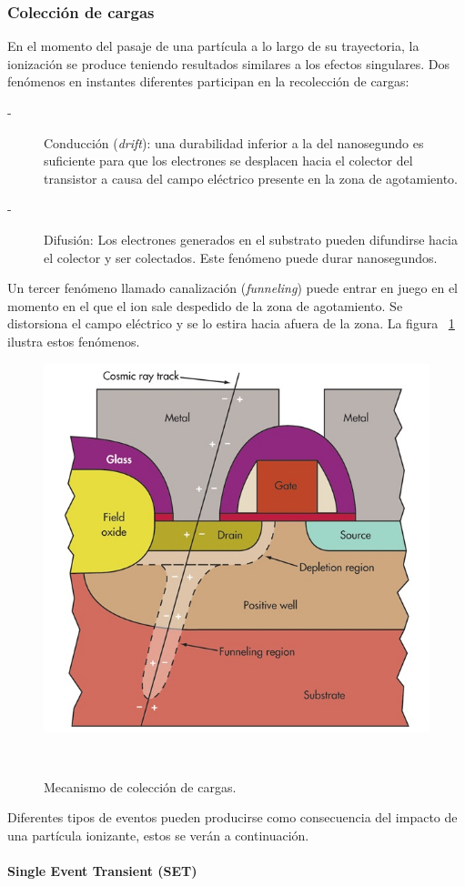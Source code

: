 \documentclass[a4paper,openright,12pt]{report}
\begin{document}
\subsubsection{Colección de cargas}

En el momento del pasaje de una partícula a lo largo de su trayectoria, la ionización se produce teniendo resultados similares a los efectos singulares. Dos fenómenos en instantes diferentes participan en la recolección de cargas:
\begin{description}
\item[-] Conducción (\textit{drift}): una durabilidad inferior a la del nanosegundo es suficiente para que los electrones se desplacen hacia el colector del transistor a causa del campo eléctrico presente en la zona de agotamiento. 
\item[-] Difusión: Los electrones generados en el substrato pueden difundirse hacia el colector y ser colectados. Este fenómeno puede durar nanosegundos.
\end{description}
Un tercer fenómeno llamado canalización (\textit{funneling}) puede entrar en juego en el momento en el que el ion sale despedido de la zona de agotamiento. Se distorsiona el campo eléctrico y se lo estira hacia afuera de la zona. La figura ~\ref{fun} ilustra estos fenómenos.

\begin{figure}[H]
	\centering
	\includegraphics[width=0.5 \textwidth]{img/cono.jpg}
	\caption{Mecanismo de colección de cargas.}~\cite{CERN1} 
	\label{fun}
\end{figure}



Diferentes tipos de eventos pueden producirse como consecuencia del impacto de una partícula ionizante, estos se verán a continuación.

\paragraph{Single Event Transient (SET) } \hfill \break
\end{document}
